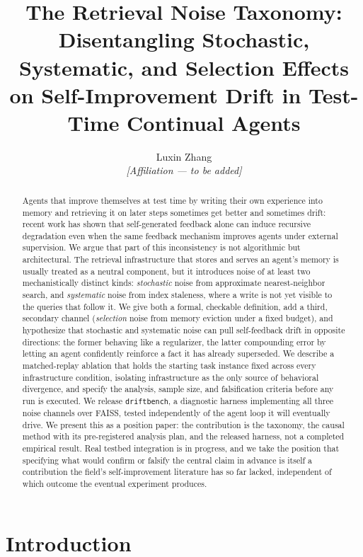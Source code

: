 \documentclass{article}
\title{The Retrieval Noise Taxonomy: Disentangling Stochastic, Systematic, and Selection Effects on Self-Improvement Drift in Test-Time Continual Agents}
\author{
  Luxin Zhang \\
  \textit{[Affiliation --- to be added]} \\
}
\begin{document}
\maketitle

\begin{abstract}
Agents that improve themselves at test time by writing their own experience into memory and retrieving it on later steps sometimes get better and sometimes drift: recent work has shown that self-generated feedback alone can induce recursive degradation even when the same feedback mechanism improves agents under external supervision. We argue that part of this inconsistency is not algorithmic but architectural. The retrieval infrastructure that stores and serves an agent's memory is usually treated as a neutral component, but it introduces noise of at least two mechanistically distinct kinds: \emph{stochastic} noise from approximate nearest-neighbor search, and \emph{systematic} noise from index staleness, where a write is not yet visible to the queries that follow it. We give both a formal, checkable definition, add a third, secondary channel (\emph{selection} noise from memory eviction under a fixed budget), and hypothesize that stochastic and systematic noise can pull self-feedback drift in opposite directions: the former behaving like a regularizer, the latter compounding error by letting an agent confidently reinforce a fact it has already superseded. We describe a matched-replay ablation that holds the starting task instance fixed across every infrastructure condition, isolating infrastructure as the only source of behavioral divergence, and specify the analysis, sample size, and falsification criteria before any run is executed. We release \texttt{driftbench}, a diagnostic harness implementing all three noise channels over FAISS, tested independently of the agent loop it will eventually drive. We present this as a position paper: the contribution is the taxonomy, the causal method with its pre-registered analysis plan, and the released harness, not a completed empirical result. Real testbed integration is in progress, and we take the position that specifying what would confirm or falsify the central claim in advance is itself a contribution the field's self-improvement literature has so far lacked, independent of which outcome the eventual experiment produces.
\end{abstract}

\section{Introduction}
\end{document}
